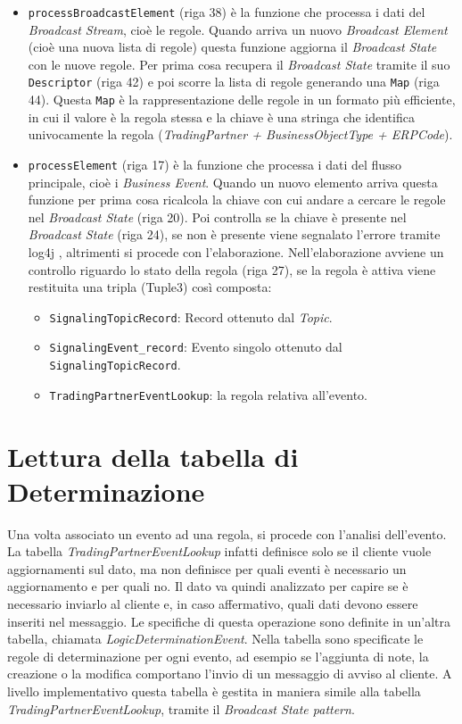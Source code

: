 \begin{itemize}
    \item \texttt{processBroadcastElement} (riga 38) è la funzione che processa i dati del \textit{Broadcast Stream}, cioè le regole.
    Quando arriva un nuovo \textit{Broadcast Element} (cioè una nuova lista di regole) questa funzione aggiorna il \textit{Broadcast State} con le nuove regole.
    Per prima cosa recupera il \textit{Broadcast State} tramite il suo \texttt{Descriptor} (riga 42) e poi scorre la lista di regole generando una \texttt{Map} (riga 44).
    Questa \texttt{Map} è la rappresentazione delle regole in un formato più efficiente, in cui il valore è la regola stessa e la chiave è una stringa che identifica univocamente la regola
    (\textit{TradingPartner + BusinessObjectType + ERPCode}).
    \item \texttt{processElement} (riga 17) è la funzione che processa i dati del flusso principale, cioè i \textit{Business Event}.
    Quando un nuovo elemento arriva questa funzione per prima cosa ricalcola la chiave con cui andare a cercare le regole nel \textit{Broadcast State} (riga 20).
    Poi controlla se la chiave è presente nel \textit{Broadcast State} (riga 24), se non è presente viene segnalato l'errore tramite log4j , altrimenti si procede con l'elaborazione.
    Nell'elaborazione avviene un controllo riguardo lo stato della regola (riga 27), se la regola è attiva viene restituita una tripla (Tuple3) così composta:
    \begin{itemize}
        \item \texttt{SignalingTopicRecord}: Record ottenuto dal \textit{Topic}.
        \item \texttt{SignalingEvent\_record}: Evento singolo ottenuto dal \texttt{Signaling\-Topic\-Record}.
        \item \texttt{TradingPartnerEventLookup}: la regola relativa all'evento.
    \end{itemize}
\end{itemize}

\section{Lettura della tabella di Determinazione}
\label{sec:LetturaDellaTabellaDiDeterminazione}
Una volta associato un evento ad una regola, si procede con l'analisi dell'evento. La tabella \textit{TradingPartnerEventLookup} infatti definisce solo se il cliente vuole aggiornamenti sul dato,
ma non definisce per quali eventi è necessario un aggiornamento e per quali no. 
Il dato va quindi analizzato per capire se è necessario inviarlo al cliente e, in caso affermativo, quali dati devono essere inseriti nel messaggio.
Le specifiche di questa operazione sono definite in un'altra tabella, chiamata \textit{LogicDeterminationEvent}.
Nella tabella sono specificate le regole di determinazione per ogni evento, ad esempio se l'aggiunta di note, la creazione o la modifica 
comportano l'invio di un messaggio di avviso al cliente.
A livello implementativo questa tabella è gestita in maniera simile alla tabella \textit{TradingPartnerEventLookup}, tramite il \textit{Broadcast State pattern}.

